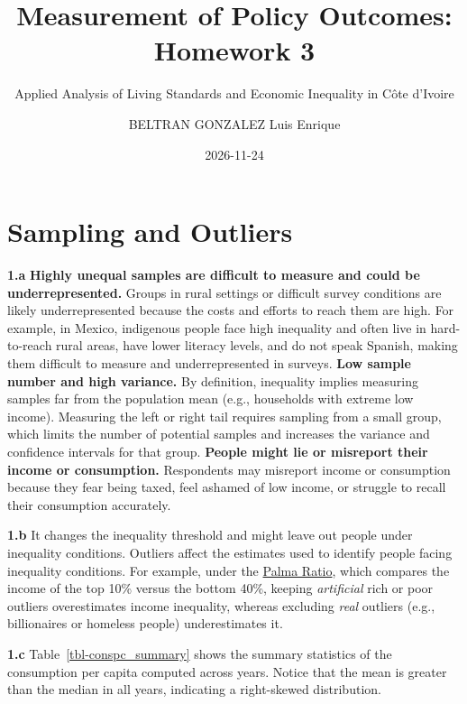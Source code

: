 \documentclass[
  letterpaper,
  DIV=11,
  numbers=noendperiod]{scrartcl}
\title{Measurement of Policy Outcomes: Homework 3}
\subtitle{Applied Analysis of Living Standards and Economic Inequality
in Côte d'Ivoire}
\author{BELTRAN GONZALEZ Luis Enrique}
\date{2026-11-24}
\begin{document}
\maketitle


\section{Sampling and Outliers}\label{sampling-and-outliers}

\textbf{1.a} \textbf{Highly unequal samples are difficult to measure and
could be underrepresented.} Groups in rural settings or difficult survey
conditions are likely underrepresented because the costs and efforts to
reach them are high. For example, in Mexico, indigenous people face high
inequality and often live in hard-to-reach rural areas, have lower
literacy levels, and do not speak Spanish, making them difficult to
measure and underrepresented in surveys. \textbf{Low sample number and
high variance.} By definition, inequality implies measuring samples far
from the population mean (e.g., households with extreme low income).
Measuring the left or right tail requires sampling from a small group,
which limits the number of potential samples and increases the variance
and confidence intervals for that group. \textbf{People might lie or
misreport their income or consumption.} Respondents may misreport income
or consumption because they fear being taxed, feel ashamed of low
income, or struggle to recall their consumption accurately.

\textbf{1.b} It changes the inequality threshold and might leave out
people under inequality conditions. Outliers affect the estimates used
to identify people facing inequality conditions. For example, under the
\href{https://ourworldindata.org/grapher/palma-ratio-wid?welfare_type=before_tax}{Palma
Ratio}, which compares the income of the top 10\% versus the bottom
40\%, keeping \emph{artificial} rich or poor outliers overestimates
income inequality, whereas excluding \emph{real} outliers (e.g.,
billionaires or homeless people) underestimates it.

\textbf{1.c} Table~\ref{tbl-conspc_summary} shows the summary statistics
of the consumption per capita computed across years. Notice that the
mean is greater than the median in all years, indicating a right-skewed
distribution.
\end{document}
